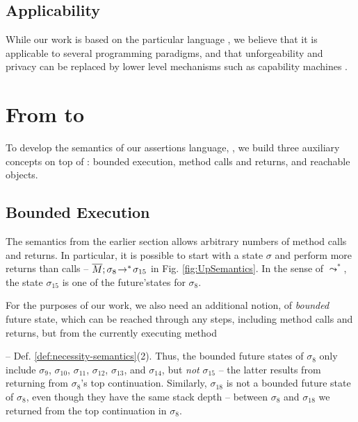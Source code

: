\subsection*{Applicability} 
While our work is based on the particular language  \LangOO , %
we believe that it is applicable to several programming paradigms, and  that   unforgeability and privacy
 can be replaced  by lower level mechanisms such as capability machines \cite{vanproving,davis2019cheriabi}.


\section{From \LangOO to \AssertLang}

{To develop the semantics of our assertions language, \AssertLang, we   build three auxiliary concepts on  top of  \LangOO: bounded execution, method calls and returns, and reachable objects.}


\subsection{Bounded Execution}
\label{sect:bounded}

{The semantics from the earlier section allows arbitrary numbers of method calls and returns. 
In particular, it is possible to start with a state $\sigma$ and perform more returns than calls --
\eg $\overline{M};\sigma_{8}\! \rightarrow^*\! {\sigma_{15}}$  in  Fig. \ref{fig:UpSemantics}.
{In the sense of $\leadsto^*$,  the state $\sigma_{15}$  is one of the future'states for $\sigma_8$.}

{For} the purposes of our work, we {also} need an {additional} notion, of    \emph{bounded} future state, which  can be reached through any   steps, including method calls and returns, but  %
from the currently executing method} -- \cf Def. \ref{def:necessity-semantics}(2). 
Thus, the {bounded} future states of $\sigma_8$  only include 
 $\sigma_9$, $\sigma_{10}$, $\sigma_{11}$, $\sigma_{12}$, $\sigma_{13}$, and $\sigma_{14}$, but \emph{not} $\sigma_{15}$  -- the latter results from returning from $\sigma_{8}$'s top continuation.  
 {Similarly, $\sigma_{18}$ is not a bounded future state of $\sigma_8$, even though they have the same stack depth -- between $\sigma_{8}$ 
 and  $\sigma_{18}$ we returned from the top continuation in $\sigma_{8}$.}

